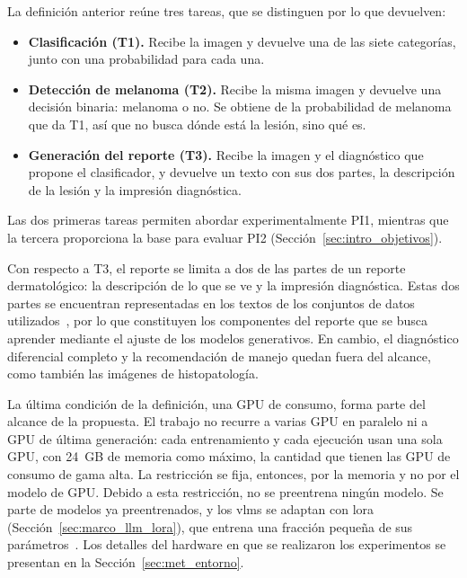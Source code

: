 La definición anterior reúne tres tareas, que se distinguen por lo que devuelven:
\begin{itemize}
    \item \textbf{Clasificación (T1).} Recibe la imagen y devuelve una de las siete categorías, junto con una
    probabilidad para cada una.
    \item \textbf{Detección de melanoma (T2).} Recibe la misma imagen y devuelve una decisión binaria: melanoma o no.
    Se obtiene de la probabilidad de melanoma que da T1, así que no busca dónde está la lesión, sino qué es.
    \item \textbf{Generación del reporte (T3).} Recibe la imagen y el diagnóstico que propone el clasificador, y
    devuelve un texto con sus dos partes, la descripción de la lesión y la impresión diagnóstica.
\end{itemize}
Las dos primeras tareas permiten abordar experimentalmente PI1, mientras que la tercera proporciona la base para evaluar PI2 (Sección~\ref{sec:intro_objetivos}).

Con respecto a T3, el reporte se limita a dos de las partes de un reporte dermatológico: la descripción de lo que se
ve y la impresión diagnóstica. Estas dos partes se encuentran representadas en los textos de los conjuntos de datos utilizados~\cite{shen2025skincare}, por lo que constituyen los componentes del reporte que se busca aprender mediante el ajuste de los modelos generativos. En cambio, el diagnóstico
diferencial completo y la recomendación de manejo quedan fuera del alcance, como también las imágenes de
histopatología.

La última condición de la definición, una GPU de consumo, forma parte del alcance de la propuesta. El trabajo no
recurre a varias GPU en paralelo ni a GPU de última generación: cada entrenamiento y cada ejecución usan una sola GPU,
con 24~GB de memoria como máximo, la cantidad que tienen las GPU de consumo de gama alta. La restricción se fija, entonces, por la
memoria y no por el modelo de GPU. Debido a esta restricción, no se preentrena ningún modelo. Se parte de modelos ya
preentrenados, y los \glspl{vlm} se adaptan con \gls{lora} (Sección~\ref{sec:marco_llm_lora}), que entrena una
fracción pequeña de sus parámetros~\cite{hu2021lora}. Los detalles del hardware en que se realizaron los experimentos se presentan en la Sección~\ref{sec:met_entorno}.

